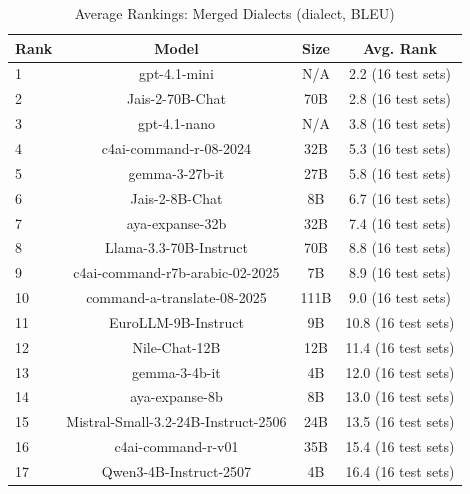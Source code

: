 \begin{table}[htbp]
\centering
\caption{Average Rankings: Merged Dialects (dialect, BLEU)}
\label{tab:avg_rankings_bleu_dialect}
\begin{tabular}{l@{\hspace{3pt}}c@{\hspace{3pt}}c@{\hspace{3pt}}c}
\toprule
Rank & Model & Size & Avg. Rank \\
\midrule
1 & gpt-4.1-mini & N/A & 2.2 (16 test sets) \\
2 & Jais-2-70B-Chat & 70B & 2.8 (16 test sets) \\
3 & gpt-4.1-nano & N/A & 3.8 (16 test sets) \\
4 & c4ai-command-r-08-2024 & 32B & 5.3 (16 test sets) \\
5 & gemma-3-27b-it & 27B & 5.8 (16 test sets) \\
6 & Jais-2-8B-Chat & 8B & 6.7 (16 test sets) \\
7 & aya-expanse-32b & 32B & 7.4 (16 test sets) \\
8 & Llama-3.3-70B-Instruct & 70B & 8.8 (16 test sets) \\
9 & c4ai-command-r7b-arabic-02-2025 & 7B & 8.9 (16 test sets) \\
10 & command-a-translate-08-2025 & 111B & 9.0 (16 test sets) \\
11 & EuroLLM-9B-Instruct & 9B & 10.8 (16 test sets) \\
12 & Nile-Chat-12B & 12B & 11.4 (16 test sets) \\
13 & gemma-3-4b-it & 4B & 12.0 (16 test sets) \\
14 & aya-expanse-8b & 8B & 13.0 (16 test sets) \\
15 & Mistral-Small-3.2-24B-Instruct-2506 & 24B & 13.5 (16 test sets) \\
16 & c4ai-command-r-v01 & 35B & 15.4 (16 test sets) \\
17 & Qwen3-4B-Instruct-2507 & 4B & 16.4 (16 test sets) \\
\bottomrule
\end{tabular}
\end{table}
